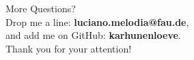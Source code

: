 \documentclass[aspectratio=169,13pt]{beamer}
\newcommand\Fontvi{\fontsize{14}{14}\selectfont}
\newcommand\col{\bfseries}
\theoremstyle{plain}
\begin{document}
\begin{frame}[plain]
    \Fontvi
    \centering
    More Questions? \\
    Drop me a line: {\col luciano.melodia@fau.de},\\
    and add me on GitHub: {\col karhunenloeve}.\\[0.5cm]
    Thank you for your attention!
\end{frame}
\end{document}
